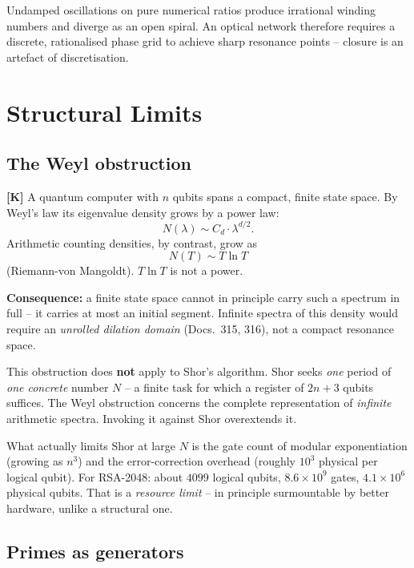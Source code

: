 Undamped oscillations on pure numerical ratios produce irrational winding
numbers and diverge as an open spiral. An optical network therefore requires a
discrete, rationalised phase grid to achieve sharp resonance points -- closure
is an artefact of discretisation.

\section{Structural Limits}

\subsection{The Weyl obstruction}

\textbf{[K]} A quantum computer with $n$ qubits spans a compact, finite state
space. By Weyl's law its eigenvalue density grows by a power law:
\begin{equation}
  N(\lambda) \sim C_d \cdot \lambda^{d/2}.
\end{equation}
Arithmetic counting densities, by contrast, grow as
\begin{equation}
  N(T) \sim T\ln T
\end{equation}
(Riemann-von Mangoldt). $T\ln T$ is not a power.

\textbf{Consequence:} a finite state space cannot in principle carry such a
spectrum in full -- it carries at most an initial segment. Infinite spectra of
this density would require an \emph{unrolled dilation domain} (Docs.~315, 316),
not a compact resonance space.

\begin{keyresult}
This obstruction does \textbf{not} apply to Shor's algorithm. Shor seeks
\emph{one} period of \emph{one concrete} number $N$ -- a finite task for which
a register of $2n+3$ qubits suffices. The Weyl obstruction concerns the
complete representation of \emph{infinite} arithmetic spectra. Invoking it
against Shor overextends it.

What actually limits Shor at large $N$ is the gate count of modular
exponentiation (growing as $n^3$) and the error-correction overhead (roughly
$10^3$ physical per logical qubit). For RSA-2048: about $4099$ logical qubits,
$8.6\times10^9$ gates, $4.1\times10^6$ physical qubits. That is a
\emph{resource limit} -- in principle surmountable by better hardware, unlike
a structural one.
\end{keyresult}

\subsection{Primes as generators}

